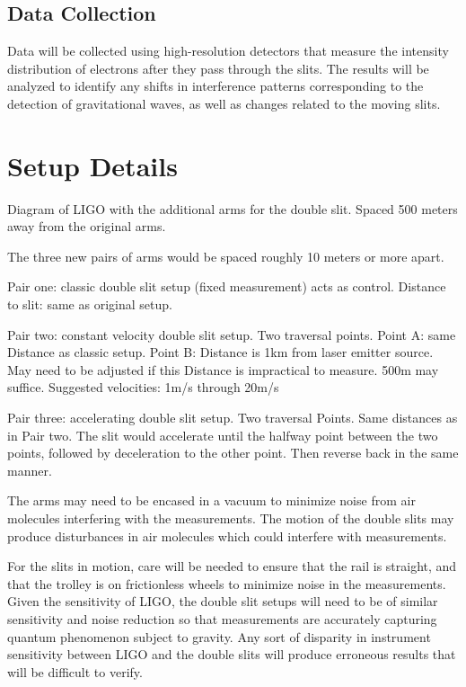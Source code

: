 \documentclass{article}
\begin{document}
\subsection{Data Collection}
Data will be collected using high-resolution detectors that measure the intensity distribution of electrons after they pass through the slits. The results will be analyzed to identify any shifts in interference patterns corresponding to the detection of gravitational waves, as well as changes related to the moving slits.

\section{Setup Details}
Diagram of LIGO with the additional arms for the double slit. Spaced 500 meters away from the original arms.

The three new pairs of arms would be spaced roughly 10 meters or more apart.

Pair one: classic double slit setup (fixed measurement) acts as control. Distance to slit: same as original setup.

Pair two: constant velocity double slit setup. Two traversal points. Point A: same Distance as classic setup. Point B: Distance is 1km from laser emitter source. May need to be adjusted if this Distance is impractical to measure. 500m may suffice. Suggested velocities: 1m/s through 20m/s

Pair three: accelerating double slit setup. Two traversal Points. Same distances as in Pair two. The slit would accelerate until the halfway point between the two points, followed by deceleration to the other point. Then reverse back in the same manner. 

The arms may need to be encased in a vacuum to minimize noise from air molecules interfering with the measurements. The motion of the double slits may produce disturbances in air molecules which could interfere with measurements. 

For the slits in motion, care will be needed to ensure that the rail is straight, and that the trolley is on frictionless wheels to minimize noise in the measurements. Given the sensitivity of LIGO, the double slit setups will need to be of similar sensitivity and noise reduction so that measurements are accurately capturing quantum phenomenon subject to gravity. Any sort of disparity in instrument sensitivity between LIGO and the double slits will produce erroneous results that will be difficult to verify. 
\end{document}
